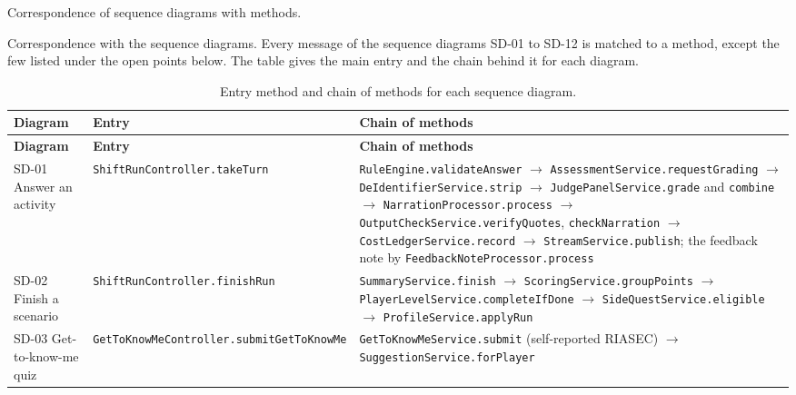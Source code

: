 Correspondence of sequence diagrams with methods.

Correspondence with the sequence diagrams. Every message of the sequence diagrams SD-01 to SD-12 is matched to a method, except the few listed under the open points below. The table gives the main entry and the chain behind it for each diagram.

{\small{}\renewcommand{\arraystretch}{1.1}
\begin{longtable}{|>{\raggedright\arraybackslash}p{}|>{\raggedright\arraybackslash}p{}|>{\raggedright\arraybackslash}p{}|}
\caption{Entry method and chain of methods for each sequence diagram.} \\
\hline
\textbf{Diagram} & \textbf{Entry} & \textbf{Chain of methods} \\ \hline
\endfirsthead
\hline
\textbf{Diagram} & \textbf{Entry} & \textbf{Chain of methods} \\ \hline
\endhead
SD-01 Answer an activity & \texttt{ShiftRunController.\allowbreak{}takeTurn} & \texttt{RuleEngine.\allowbreak{}validateAnswer} $\rightarrow$ \texttt{AssessmentService.\allowbreak{}requestGrading} $\rightarrow$ \texttt{DeIdentifierService.\allowbreak{}strip} $\rightarrow$ \texttt{JudgePanelService.\allowbreak{}grade} and \texttt{combine} $\rightarrow$ \texttt{NarrationProcessor.\allowbreak{}process} $\rightarrow$ \texttt{OutputCheckService.\allowbreak{}verifyQuotes}, \texttt{checkNarration} $\rightarrow$ \texttt{CostLedgerService.\allowbreak{}record} $\rightarrow$ \texttt{StreamService.\allowbreak{}publish}; the feedback note by \texttt{FeedbackNoteProcessor.\allowbreak{}process} \\ \hline
SD-02 Finish a scenario & \texttt{ShiftRunController.\allowbreak{}finishRun} & \texttt{SummaryService.\allowbreak{}finish} $\rightarrow$ \texttt{ScoringService.\allowbreak{}groupPoints} $\rightarrow$ \texttt{PlayerLevelService.\allowbreak{}completeIfDone} $\rightarrow$ \texttt{SideQuestService.\allowbreak{}eligible} $\rightarrow$ \texttt{ProfileService.\allowbreak{}applyRun} \\ \hline
SD-03 Get-\allowbreak{}to-\allowbreak{}know-\allowbreak{}me quiz & \texttt{GetToKnowMeController.\allowbreak{}submitGetToKnowMe} & \texttt{GetToKnowMeService.\allowbreak{}submit} (self-\allowbreak{}reported RIASEC) $\rightarrow$ \texttt{SuggestionService.\allowbreak{}forPlayer} \\ \hline

\end{longtable}}
